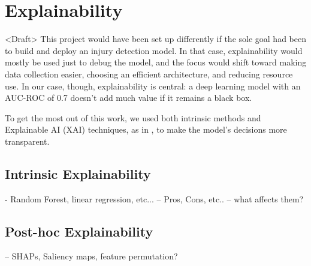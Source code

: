 \section{Explainability}\label{sec:method-explainability}
<Draft> This project would have been set up differently if the sole goal had been to build and deploy an injury detection model. In that case, explainability would mostly be used just to debug the model, and the focus would shift toward making data collection easier, choosing an efficient architecture, and reducing resource use. In our case, though, explainability is central: a deep learning model with an AUC-ROC of 0.7 doesn't add much value if it remains a black box.

To get the most out of this work, we used both intrinsic methods and Explainable AI (XAI) techniques, as in \cite{FuentesJimnez2025}, to make the model's decisions more transparent.

\subsection{Intrinsic Explainability}\label{subsec:method-intrinsic-explainability}
- Random Forest, linear regression, etc...
-- Pros, Cons, etc..
-- what affects them?

\subsection{Post-hoc Explainability}\label{subsec:method-posthoc-explainability}
-- SHAPs, Saliency maps, feature permutation?



